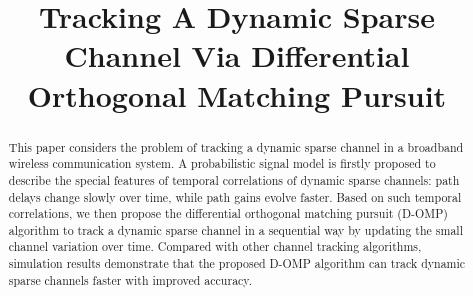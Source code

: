 \documentclass[conference]{IEEEtran}
\begin{document}
%
\title{Tracking A Dynamic Sparse Channel Via Differential Orthogonal Matching Pursuit}
\author{
}

\IEEEoverridecommandlockouts


\maketitle

\begin{abstract}
This paper considers the problem of tracking a dynamic sparse channel in a broadband wireless communication system.
A probabilistic signal model is firstly proposed to describe the special features of temporal correlations of dynamic sparse channels: path delays change slowly over time, while path gains evolve faster. %
Based on such temporal correlations, we then propose the differential orthogonal matching pursuit (D-OMP) algorithm to track a dynamic sparse channel in a sequential way by updating the small channel variation over time.
Compared with other channel tracking algorithms, simulation results demonstrate that the proposed D-OMP algorithm can track dynamic sparse channels faster with improved accuracy.
\end{abstract}
\end{document}

